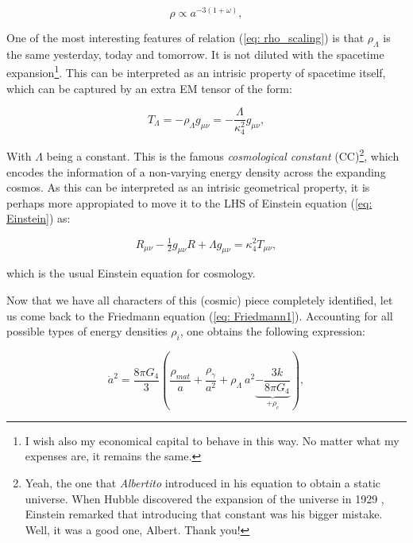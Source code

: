 \documentclass[11pt, a4paper]{article} %
\begin{document}
\begin{equation}\label{eq: rho_scaling}
	\rho \propto a^{-3\left(1+\omega\right)},
\end{equation}

One of the most interesting features of relation (\ref{eq: rho_scaling}) is that $\rho_{\Lambda}$ is the same yesterday, today and tomorrow. It is not diluted with the spacetime expansion\footnote{I wish also my economical capital to behave in this way. No matter what my expenses are, it remains the same.}. This can be interpreted as an intrisic property of spacetime itself, which can be captured by an extra EM tensor of the form:

\begin{equation}
	T_{\Lambda} = - \rho_{\Lambda}g_{\mu\nu} = - \frac{\Lambda}{\kappa^{2}_{4}} g_{\mu\nu},
\end{equation}

With $\Lambda$ being a constant. This is the famous \textit{cosmological constant} (CC)\footnote{Yeah, the one that \textit{Albertito} introduced in his equation to obtain a static universe. When Hubble discovered the expansion of the universe in 1929 \cite{hubble1929relation}, Einstein remarked that introducing that constant was his bigger mistake. Well, it was a good one, Albert. Thank you!}, which encodes the information of a non-varying energy density across the expanding cosmos. As this can be interpreted as an intrisic geometrical property, it is perhaps more appropiated to move it to the LHS of Einstein equation (\ref{eq: Einstein}) as: 

\begin{equation}\label{eq: Einstein with Lambda}
	R_{\mu\nu} - \tfrac{1}{2} g_{\mu\nu} R + \Lambda g_{\mu\nu}  = \kappa^{2}_{4} T_{\mu \nu},
\end{equation}

which is the usual Einstein equation for cosmology. 

Now that we have all characters of this (cosmic) piece completely identified, let us come back to the Friedmann equation (\ref{eq: Friedmann1}). Accounting for all possible types of energy densities $\rho_{i}$, one obtains the following expression:

\begin{equation}\label{eq: thy_pot}
	\dot{a}^{2} = \frac{8 \pi G_{4}}{3} \left(\frac{\rho_{mat}}{a} + \frac{\rho_{\gamma}}{a^{2}} + \rho_{\Lambda} \:a^{2}\underbrace{- \frac{3 k}{8 \pi G_{4}}}_{+\rho_{c}}\right),
\end{equation}
\end{document}
